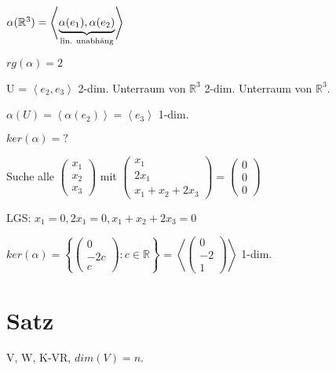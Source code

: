 \documentclass[a4paper, openany]{book}
\begin{document}
      \par \medskip

      $\alpha(\mathbb{R}^3) = \left \langle \underbrace{\alpha(e_1), \alpha(e_2)}_{\textnormal{lin. unabhäng}} \right \rangle$

      $rg(\alpha) = 2$

      U = $\left \langle e_2, e_3 \right \rangle$ 2-dim. Unterraum von $\mathbb{R}^3$ 2-dim. Unterraum von $\mathbb{R}^3$.

      $\alpha(U) = \left \langle \alpha(e_2) \right \rangle = \left \langle e_3 \right \rangle$ 1-dim. 

      $ker(\alpha) = ?$

      Suche alle $\begin{pmatrix}x_1 \\ x_2 \\ x_3 \end{pmatrix}$ mit $\begin{pmatrix}x_1 \\ 2x_1 \\ x_1 + x_2 +2x_3 \end{pmatrix} = \begin{pmatrix}0 \\ 0 \\ 0 \end{pmatrix}$

      \par \medskip

      \par \medskip

      LGS: $x_1 = 0 , 2x_1 = 0, x_1 + x_2 + 2x_3 = 0$

      \par \medskip

      $ker(\alpha) =  \left \lbrace \begin{pmatrix}0 \\ -2c \\ c \end{pmatrix} : c \in \mathbb{R} \right \rbrace$ = $\left \langle \begin{pmatrix}0 \\ -2 \\ 1 \end{pmatrix} \right \rangle$ 1-dim.

      \section{Satz}

      V, W, K-VR, $dim(V) = n$.
\end{document}

